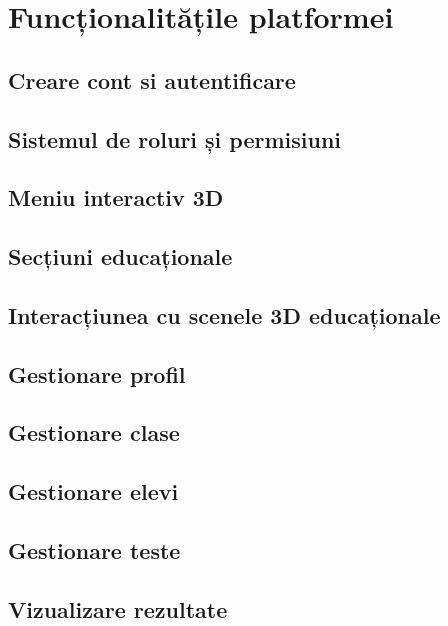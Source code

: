 \section{Funcționalitățile platformei}
\label{sec:proj-features}
\subsection{Creare cont si autentificare}
\subsection{Sistemul de roluri și permisiuni}
\subsection{Meniu interactiv 3D}
\subsection{Secțiuni educaționale}
\subsection{Interacțiunea cu scenele 3D educaționale}
\subsection{Gestionare profil}
\subsection{Gestionare clase}
\subsection{Gestionare elevi}
\subsection{Gestionare teste}
\subsection{Vizualizare rezultate}






